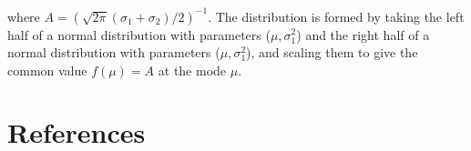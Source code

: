 \documentclass[review]{elsarticle}
\begin{document}
where $A = \left(\sqrt{2\pi}(\sigma_1 + \sigma_2)/2\right)^{-1}$. The distribution is formed by taking the left half of a normal distribution with parameters ($\mu, \sigma_1^2$) and the right half of a normal distribution with parameters ($\mu, \sigma_1^2$), and scaling them to give the common value $f(\mu)=A$ at the mode $\mu$.







\section*{References}


\end{document}
